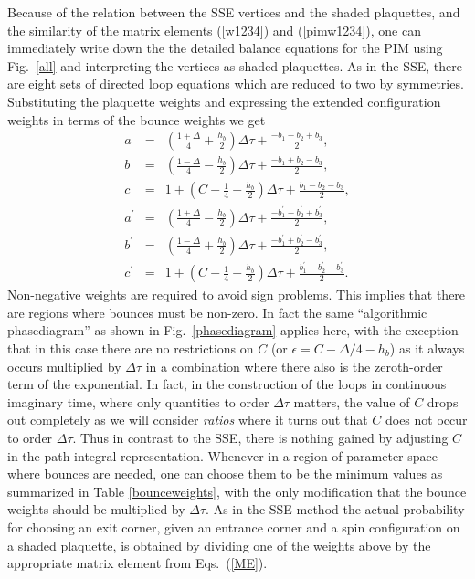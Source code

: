 \documentclass[10pt,pre,aps,twocolumn,showpacs,superscriptaddress,
floatfix]{revtex4}
\newcommand{\bea}{\begin{eqnarray}}
\newcommand{\eea}{\end{eqnarray}}
\newcommand{\f}{\frac}
\newcommand{\Deltatau}{\Delta \tau}
\begin{document}
Because of the relation between the SSE vertices and the shaded plaquettes, 
and the similarity of the matrix elements (\ref{w1234}) and (\ref{pimw1234}),
one can immediately write down the the detailed balance equations for the PIM
using Fig.~\ref{all} and interpreting the vertices as shaded plaquettes. 
As in the SSE, there are eight sets of directed loop equations which are 
reduced to two by symmetries. Substituting the plaquette weights and expressing
the extended configuration weights in terms of the bounce weights we get 
\bea
	a & = & \left( \f{1+\Delta}{4} + \f{h_b}{2} \right) \Deltatau 
	+ \f{-b_1-b_2+b_3}{2},
	\nonumber \\
	b & = & \left( \f{1-\Delta}{4} - \f{h_b}{2} \right) \Deltatau + 
	\f{-b_1+b_2-b_3}{2},
	\nonumber \\
	c & = & 1+ \left(C -\f{1}{4} - \f{h_b}{2}\right) \Deltatau 
	+ \f{b_1-b_2-b_3}{2},
	\nonumber \\
	a^\prime & = & \left( \f{1+\Delta}{4} - \f{h_b}{2} \right) \Deltatau 
	+ \f{-b^\prime_1-b^\prime_2+b^\prime_3}{2},
	\label{PIMeqs} \\
	b^\prime & = & \left( \f{1-\Delta}{4} + \f{h_b}{2} \right) \Deltatau + 
	\f{-b^\prime_1+b^\prime_2-b^\prime_3}{2},
 	\nonumber \\
	c^\prime & = & 1+ \left(C -\f{1}{4} + \f{h_b}{2}\right) \Deltatau 
	+ \f{b^\prime_1-b^\prime_2-b^\prime_3}{2}.
	\nonumber
\eea 
Non-negative weights are required to avoid sign problems. This
implies that there are regions where bounces must be non-zero. In fact
the same ``algorithmic phasediagram'' as shown in Fig.~\ref{phasediagram} 
applies here, with the exception that in this case there are no
restrictions on $C$ (or $\epsilon = C-\Delta/4-h_b$) as 
it always occurs multiplied by $\Deltatau$ in
a combination where there also is the zeroth-order term of the exponential. 
In fact, in the construction of the loops in continuous imaginary time, where
only quantities to order $\Deltatau$ matters, the value of $C$ drops out 
completely as we will consider {\em ratios} where it turns out that $C$ 
does not occur to 
order $\Deltatau$. Thus in contrast to the SSE, there is nothing gained by 
adjusting $C$ in the path integral representation. Whenever 
in a region of parameter space where bounces are needed, one can choose them 
to be the minimum values as summarized in Table \ref{bounceweights}, with 
the only modification that the bounce weights should be multiplied by 
$\Deltatau$. As in the SSE method the actual probability for choosing an 
exit corner, given an entrance corner and a spin configuration on a shaded 
plaquette, is obtained by dividing one of the weights above by the 
appropriate matrix element from Eqs.~(\ref{ME}).
\end{document}
